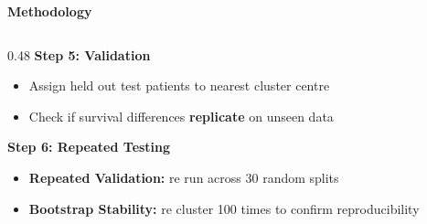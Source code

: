 \documentclass[aspectratio=169, 10pt]{beamer}
\begin{document}
\begin{frame}{\textbf{Methodology}}
\begin{columns}[T]
\begin{column}{0.48\textwidth}
\textbf{Step 5: Validation}
\begin{itemize}
    \item Assign held out test patients to nearest cluster centre
    \item Check if survival differences \textbf{replicate} on unseen data
\end{itemize}
\vspace{0.1cm}

\textbf{Step 6: Repeated Testing}
\begin{itemize}
    \item \textbf{Repeated Validation:} re run across 30 random splits
    \item \textbf{Bootstrap Stability:} re cluster 100 times to confirm reproducibility
\end{itemize}

\end{column}
\end{columns}

\end{frame}
\end{document}
